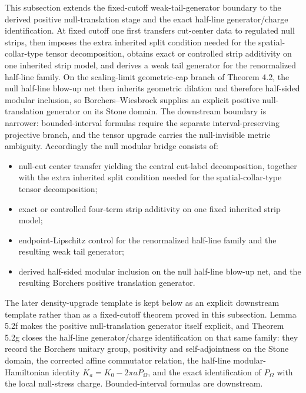 This subsection extends the fixed-cutoff weak-tail-generator boundary to the derived positive null-translation stage and the exact half-line generator/charge identification. At fixed cutoff one first transfers cut-center data to regulated null strips, then imposes the extra inherited split condition needed for the spatial-collar-type tensor decomposition, obtains exact or controlled strip additivity on one inherited strip model, and derives a weak tail generator for the renormalized half-line family. On the scaling-limit geometric-cap branch of Theorem 4.2, the null half-line blow-up net then inherits geometric dilation and therefore half-sided modular inclusion, so Borchers--Wiesbrock supplies an explicit positive null-translation generator on its Stone domain. The downstream boundary is narrower: bounded-interval formulas require the separate interval-preserving projective branch, and the tensor upgrade carries the null-invisible metric ambiguity. Accordingly the null modular bridge consists of:
\begin{itemize}
\tightlist
\item
  null-cut center transfer yielding the central cut-label decomposition, together with the extra inherited split condition needed for the spatial-collar-type tensor decomposition;
\item
  exact or controlled four-term strip additivity on one fixed inherited strip model;
\item
  endpoint-Lipschitz control for the renormalized half-line family and the resulting weak tail generator;
\item
  derived half-sided modular inclusion on the null half-line blow-up net, and the resulting Borchers positive translation generator.
\end{itemize}
The later density-upgrade template is kept below as an explicit downstream template rather than as a fixed-cutoff theorem proved in this subsection. Lemma 5.2f makes the positive null-translation generator itself explicit, and Theorem 5.2g closes the half-line generator/charge identification on that same family: they record the Borchers unitary group, positivity and self-adjointness on the Stone domain, the corrected affine commutator relation, the half-line modular-Hamiltonian identity \(K_a=K_0-2\pi aP_\Omega\), and the exact identification of \(P_\Omega\) with the local null-stress charge. Bounded-interval formulas are downstream.


